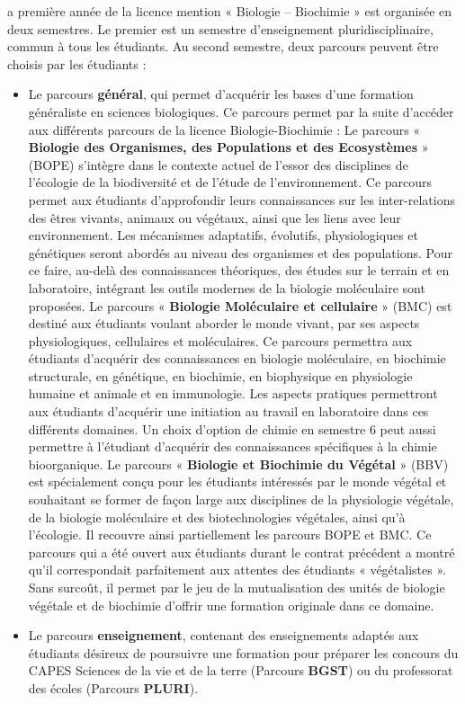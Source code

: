 \documentclass[10pt, a5paper]{report}
\begin{document}
\begin{spacing}{1.5}
a première année de la licence mention « Biologie – Biochimie » est organisée en deux semestres. Le premier est un semestre d'enseignement pluridisciplinaire, commun à tous les étudiants. Au second semestre, deux parcours peuvent être choisis par les étudiants : 
\begin{itemize}
\item Le parcours \textbf{général}, qui permet d'acquérir les bases d'une formation généraliste en sciences biologiques. Ce parcours permet par la suite d'accéder aux différents parcours de la licence Biologie-Biochimie : 
	\subitem Le parcours « \textbf{Biologie des Organismes, des Populations et des Ecosystèmes} » (BOPE) s’intègre dans le contexte actuel de l’essor des disciplines de l’écologie de la biodiversité et de l’étude de l’environnement. Ce parcours permet aux étudiants d’approfondir leurs connaissances sur les inter-relations des êtres vivants, animaux ou végétaux, ainsi que les liens avec leur environnement. Les mécanismes adaptatifs, évolutifs, physiologiques et génétiques seront abordés au niveau des organismes et des populations. Pour ce faire, au-delà des connaissances théoriques, des études sur le terrain et en laboratoire, intégrant les outils modernes de la biologie moléculaire sont  proposées.
	\subitem Le parcours « \textbf{Biologie Moléculaire et cellulaire} » (BMC) est destiné aux étudiants voulant aborder le monde vivant, par ses aspects physiologiques, cellulaires et moléculaires. Ce parcours permettra aux étudiants d’acquérir des connaissances en biologie moléculaire, en biochimie structurale, en génétique, en biochimie, en biophysique en physiologie humaine et animale et en immunologie. Les aspects pratiques permettront aux étudiants d’acquérir une initiation au travail en laboratoire dans ces différents domaines.  Un choix d’option de chimie en semestre 6 peut aussi permettre à l’étudiant d’acquérir des connaissances spécifiques à la chimie bioorganique.
	\subitem Le parcours « \textbf{Biologie et Biochimie du Végétal} » (BBV) est spécialement conçu pour les étudiants intéressés par le monde végétal et souhaitant se former de façon large aux disciplines de la physiologie végétale, de la biologie moléculaire et des biotechnologies végétales, ainsi qu’à l’écologie.  Il recouvre ainsi partiellement les parcours BOPE et BMC. Ce parcours qui a été ouvert aux étudiants durant le contrat précédent a montré qu’il correspondait parfaitement aux attentes des étudiants « végétalistes ». Sans surcoût, il permet par le jeu de la mutualisation des unités de biologie végétale et de biochimie d’offrir une formation originale dans ce domaine.
\item Le parcours \textbf{enseignement}, contenant des enseignements adaptés aux étudiants désireux de poursuivre une formation pour préparer les concours du CAPES Sciences de la vie et de la terre (Parcours \textbf{BGST}) ou du professorat des écoles (Parcours \textbf{PLURI}).
\end{itemize}


\end{spacing}
\end{document}

